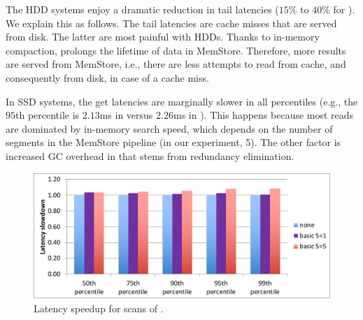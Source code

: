 The HDD systems enjoy a dramatic reduction in tail latencies ($15$\% to $40$\% for \adp). 
We explain this as follows. The tail latencies are cache misses that are served from disk. 
The latter are most painful with HDDs. Thanks to in-memory compaction, \adp\/ prolongs 
the lifetime of data in MemStore. Therefore, more results are served from MemStore, i.e., 
there are less attempts to read from cache, and consequently from disk, in case of a cache miss.  

In SSD systems, the get latencies are marginally slower in all percentiles (e.g., the 
$95$th percentile is $2.13$ms in \none\/ versus $2.26$ms in \adp). This happens
because most reads are dominated by in-memory search speed, which depends on the 
number of segments in the MemStore pipeline (in our experiment, 5). The other factor
is increased GC overhead in \adp\/ that stems from redundancy elimination. 


\begin{figure}[htb]
\includegraphics[width=\figw]{Figs/scans.pdf}
\caption{Latency speedup for scans of \basic.
}
\label{fig:scans}
\end{figure}



